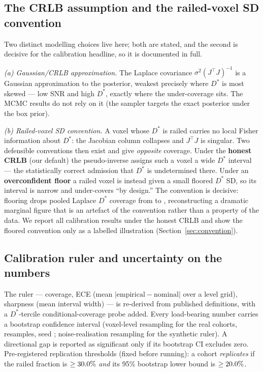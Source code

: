 \documentclass[11pt]{article}
\newcommand{\Ds}{D^{*}}
\begin{document}
\subsection{The CRLB assumption and the railed-voxel SD convention}
\label{sec:crlb}

Two distinct modelling choices live here; both are stated, and the second is
decisive for the calibration headline, so it is documented in full.

\emph{(a) Gaussian/CRLB approximation.} The Laplace covariance
$\sigma^2(J^\top J)^{-1}$ is a Gaussian approximation to the posterior, weakest
precisely where $\Ds$ is most skewed --- low SNR and high $\Ds$, exactly where the
under-coverage sits. The MCMC results do not rely on it (the sampler targets the
exact posterior under the box prior).

\emph{(b) Railed-voxel SD convention.} A voxel whose $\Ds$ is railed carries no
local Fisher information about $\Ds$: the Jacobian column collapses and $J^\top J$
is singular. Two defensible conventions then exist and give \emph{opposite}
coverage. Under the \textbf{honest CRLB} (our default) the pseudo-inverse assigns
such a voxel a wide $\Ds$ interval --- the statistically correct admission that
$\Ds$ is undetermined there. Under an \textbf{overconfident floor} a railed voxel
is instead given a small floored $\Ds$ SD, so its interval is narrow and
under-covers ``by design.'' The convention is decisive: flooring drops pooled
Laplace $\Ds$ coverage from \covLapHonPool{} to \covLapFloPool, reconstructing a
dramatic marginal figure that is an artefact of the convention rather than a
property of the data. We report all calibration results under the honest CRLB and
show the floored convention only as a labelled illustration
(Section~\ref{sec:convention}).

\subsection{Calibration ruler and uncertainty on the numbers}

The ruler --- coverage, ECE (mean $|\text{empirical}-\text{nominal}|$ over a level
grid), sharpness (mean interval width) --- is re-derived from published
definitions, with a $\Ds$-tercile conditional-coverage probe added. Every
load-bearing number carries a bootstrap confidence interval (voxel-level
resampling for the real cohorts, \railNboot{} resamples, seed \railSeed;
noise-realisation resampling for the synthetic ruler). A directional gap is
reported as significant only if its bootstrap CI excludes zero. Pre-registered
replication thresholds (fixed before running): a cohort \emph{replicates} if the
railed fraction is $\ge30.0\%$ \emph{and} its 95\% bootstrap lower bound is
$\ge20.0\%$.
\end{document}
